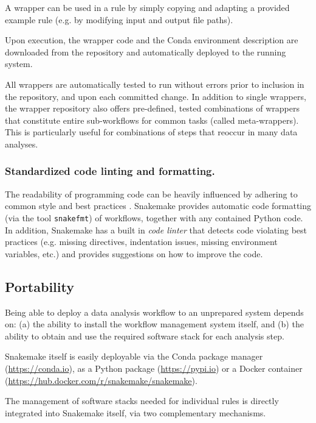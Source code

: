 \documentclass[parskip=half]{scrartcl}
\let\plainurl\url
\renewcommand{\url}[1]{\protect\plainurl{#1}}
\begin{document}
A wrapper can be used in a rule by simply copying and adapting a provided example rule (e.g. by modifying input and output file paths).

Upon execution, the wrapper code and the Conda environment description are downloaded from the repository and automatically deployed to the running system.

All wrappers are automatically tested to run without errors prior to inclusion in the repository, and upon each committed change. In addition to single wrappers, the wrapper repository also offers pre-defined, tested combinations of wrappers that constitute entire sub-workflows for common tasks (called meta-wrappers). 
This is particularly useful for combinations of steps that reoccur in many data analyses.

\subsubsection{Standardized code linting and formatting.}\label{sec:style}

The readability of programming code can be heavily influenced by adhering to common style and best practices \parencite{tysell_sundkvist_code_2017}.
Snakemake provides automatic code formatting (via the tool \lstinline!snakefmt!) of workflows, together with any contained Python code.
In addition, Snakemake has a built in \emph{code linter} that detects code violating best practices (e.g. missing directives, indentation issues, missing environment variables, etc.) and provides suggestions on how to improve the code.

\subsection{Portability}\label{sec:portability}

Being able to deploy a data analysis workflow to an unprepared system depends on: (a) the ability to install the workflow management system itself, and (b) the ability to obtain and use the required software stack for each analysis step.

Snakemake itself is easily deployable via the Conda package manager (\url{https://conda.io}), as a Python package (\url{https://pypi.io}) or a Docker container (\url{https://hub.docker.com/r/snakemake/snakemake}).

The management of software stacks needed for individual rules is directly integrated into Snakemake itself, via two complementary mechanisms.
\end{document}
